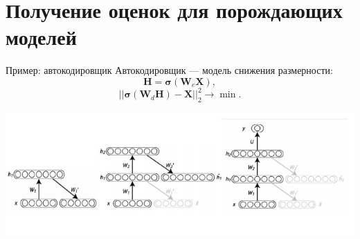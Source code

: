 \documentclass[10pt,pdf,utf8,russian,aspectratio=169]{beamer}
\begin{document}
\section{Получение оценок для порождающих моделей}
\begin{frame}{Пример: автокодировщик}
Автокодировщик --- модель снижения размерности:
$$
	\mathbf{H} = \boldsymbol{\sigma}(\mathbf{W}_e \mathbf{X}),
$$
$$
	||\boldsymbol{\sigma}(\mathbf{W}_d\mathbf{H}) - \mathbf{X}||_2^2 \to \min.
$$

\includegraphics[width=\textwidth]{bengio.png}
\end{frame}
\end{document}
